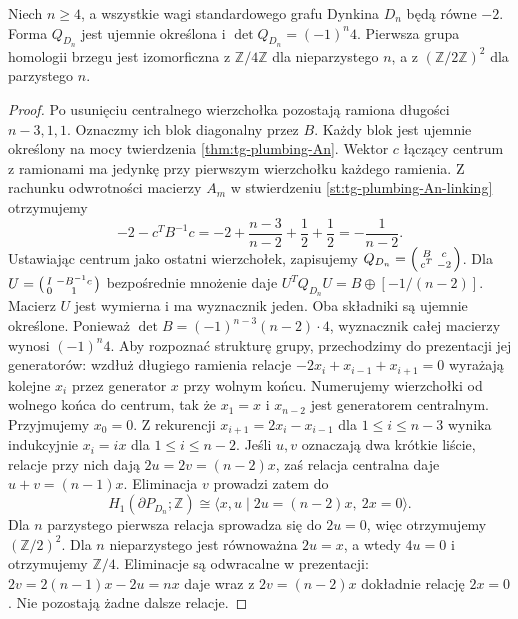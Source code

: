 \begin{twierdzenie}
\label{thm:tg-plumbing-Dn}
Niech $n\ge4$, a wszystkie wagi standardowego
grafu Dynkina $D_n$ będą równe $-2$.
Forma $Q_{D_n}$ jest ujemnie określona i
$\det Q_{D_n}=(-1)^n4$. Pierwsza grupa homologii brzegu jest
izomorficzna z $\mathbb Z/4\mathbb Z$
dla nieparzystego $n$, a z
$(\mathbb Z/2\mathbb Z)^2$ dla parzystego $n$.
\end{twierdzenie}
\begin{proof}
Po usunięciu centralnego wierzchołka
pozostają ramiona długości $n-3,1,1$.
Oznaczmy ich blok diagonalny przez $B$.
Każdy blok jest ujemnie określony na mocy
twierdzenia \ref{thm:tg-plumbing-An}.
Wektor $c$ łączący centrum z ramionami
ma jedynkę przy pierwszym wierzchołku
każdego ramienia. Z rachunku odwrotności
macierzy $A_m$ w stwierdzeniu
\ref{st:tg-plumbing-An-linking} otrzymujemy
\[
-2-c^TB^{-1}c
=-2+\frac{n-3}{n-2}+\frac12+\frac12
=-\frac1{n-2}.
\]
Ustawiając centrum jako ostatni wierzchołek,
zapisujemy $Q_{D_n}=\begin{psmallmatrix}B&c\\c^T&-2\end{psmallmatrix}$.
Dla $U=\begin{psmallmatrix}I&-B^{-1}c\\0&1\end{psmallmatrix}$
bezpośrednie mnożenie daje
$U^T Q_{D_n} U=B\oplus[-1/(n-2)]$.
Macierz $U$ jest wymierna i ma wyznacznik jeden.
Oba składniki są ujemnie określone.
Ponieważ $\det B=(-1)^{n-3}(n-2)\cdot4$,
wyznacznik całej macierzy wynosi $(-1)^n4$.
Aby rozpoznać strukturę grupy,
przechodzimy do prezentacji jej generatorów: wzdłuż długiego
ramienia relacje $-2x_i+x_{i-1}+x_{i+1}=0$ wyrażają
kolejne $x_i$ przez generator $x$ przy wolnym końcu.
Numerujemy wierzchołki od wolnego końca
do centrum, tak że $x_1=x$ i $x_{n-2}$ jest
generatorem centralnym. Przyjmujemy $x_0=0$.
Z rekurencji $x_{i+1}=2x_i-x_{i-1}$
dla $1\le i\le n-3$ wynika indukcyjnie
$x_i=ix$ dla $1\le i\le n-2$.
Jeśli $u,v$ oznaczają dwa krótkie liście, relacje przy
nich dają $2u=2v=(n-2)x$, zaś relacja centralna daje
$u+v=(n-1)x$. Eliminacja $v$ prowadzi zatem do
\[
H_1(\partial P_{D_n};\mathbb Z)
\cong \langle x,u\mid 2u=(n-2)x,\ 2x=0\rangle.
\]
Dla $n$ parzystego pierwsza relacja sprowadza się do
$2u=0$, więc otrzymujemy $(\mathbb Z/2)^2$.
Dla $n$ nieparzystego jest równoważna $2u=x$,
a wtedy $4u=0$ i otrzymujemy $\mathbb Z/4$.
Eliminacje są odwracalne w prezentacji:
$2v=2(n-1)x-2u=nx$ daje wraz z
$2v=(n-2)x$ dokładnie relację $2x=0$.
Nie pozostają żadne dalsze relacje.
\end{proof}

